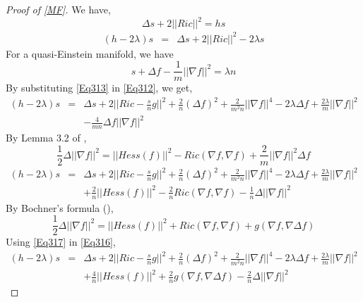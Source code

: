\documentclass[12pt]{amsart}
\theoremstyle{definition}
\numberwithin{equation}{section}
\begin{document}
\begin{proof}[Proof of \cref{MF}]
    We have,
   $$\Delta s + 2||Ric||^{2} = hs$$
    \begin{eqnarray}\label{Eq312}
        (h -2\lambda)s &=&  \Delta s + 2||Ric||^{2} - 2\lambda s
    \end{eqnarray}
    For a quasi-Einstein manifold, we have
    \begin{equation}\label{Eq313}
         s + \Delta f - \frac{1}{m}||\nabla f||^{2} = \lambda n
    \end{equation}
    By substituting \cref{Eq313} in \cref{Eq312}, we get,
    \begin{eqnarray}\label{Eq314}
        (h - 2\lambda)s &=& \Delta s + 2||Ric - \frac{s}{n}g||^{2} + \frac{2}{n}(\Delta f)^{2} + \frac{2}{m^{2}n}||\nabla f||^{4} - 2\lambda \Delta f + \frac{2\lambda}{m}||\nabla f||^{2}\nonumber\\&& - \frac{4}{mn}\Delta f ||\nabla f||^{2}
    \end{eqnarray}
    By Lemma 3.2 of \cite{RQE},
    \begin{equation}\label{Eq315}
        \frac{1}{2}\Delta ||\nabla f||^{2} = ||Hess(f)||^{2} - Ric(\nabla f, \nabla f) + \frac{2}{m}||\nabla f||^{2}\Delta f
    \end{equation}
     \begin{eqnarray}\label{Eq316}
        (h - 2\lambda)s &=& \Delta s + 2||Ric - \frac{s}{n}g||^{2} + \frac{2}{n}(\Delta f)^{2} + \frac{2}{m^{2}n}||\nabla f||^{4} - 2\lambda \Delta f + \frac{2\lambda}{m}||\nabla f||^{2}\nonumber\\&& + \frac{2}{n}||Hess(f)||^{2} - \frac{2}{n}Ric(\nabla f, \nabla f) - \frac{1}{n}\Delta ||\nabla f||^{2}
    \end{eqnarray}
     By Bochner's formula (\cite{HRFBC}),
    \begin{equation}\label{Eq317}
        \frac{1}{2}\Delta ||\nabla f||^{2} = ||Hess(f)||^{2} + Ric(\nabla f, \nabla f) + g(\nabla f, \nabla \Delta f)
    \end{equation}
    Using \cref{Eq317} in \cref{Eq316},
     \begin{eqnarray}\label{Eq318}
        (h - 2\lambda)s &=& \Delta s + 2||Ric - \frac{s}{n}g||^{2} + \frac{2}{n}(\Delta f)^{2} + \frac{2}{m^{2}n}||\nabla f||^{4} - 2\lambda \Delta f + \frac{2\lambda}{m}||\nabla f||^{2}\nonumber\\&& + \frac{4}{n}||Hess(f)||^{2} + \frac{2}{n}g(\nabla f, \nabla \Delta f) - \frac{2}{n}\Delta ||\nabla f||^{2}
    \end{eqnarray}

\end{proof}
\end{document}
